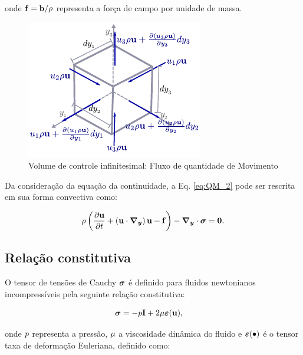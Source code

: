 \documentclass[tese_patricia]{subfiles}%
\begin{document}
\noindent onde $\mathbf{f} = \mathbf{b}/\rho$ representa a força de campo por unidade de massa.

\begin{figure}[htb!]
	\centering 
	\includegraphics[scale=1.5,trim=0cm 0.0cm 0cm 0.0cm, clip=true]{Imagens/Cap2/volInf_consQtdeMov.pdf}	
	\caption{Volume de controle infinitesimal: Fluxo de quantidade de Movimento}
	\label{fig:volInf_consQtdeMov}
\end{figure}

Da consideração da equação da continuidade, a Eq. \ref{eq:QM_2} pode ser rescrita em sua forma convectiva como:

\begin{align}
	\rho\left(\frac{\partial\mathbf{u}}{\partial t} + \left( \mathbf{u} \cdot \boldsymbol{\nabla_y} \right)  \mathbf{u}  - \mathbf{f} \right) - \boldsymbol{\nabla_y} \cdot \boldsymbol{\sigma} = \mathbf{0}. \label{eq:Navier-Stokes} 
\end{align}

\subsection{Relação constitutiva}
O tensor de tensões de Cauchy $\boldsymbol{\sigma}$ é definido para fluidos newtonianos incompressíveis pela seguinte relação constitutiva:

\begin{align}
\boldsymbol{\sigma} &= -p \mathbf{I} + 2\mu\bm{\varepsilon}(\mathbf{u}),\label{eq:tensor_tensoes_fluido}
\end{align}

\noindent onde $p$ representa a pressão, $\mu$ a viscosidade dinâmica do fluido e $\bm{\varepsilon}(\bullet)$ é o tensor taxa de deformação Euleriana, definido como:
\end{document}
